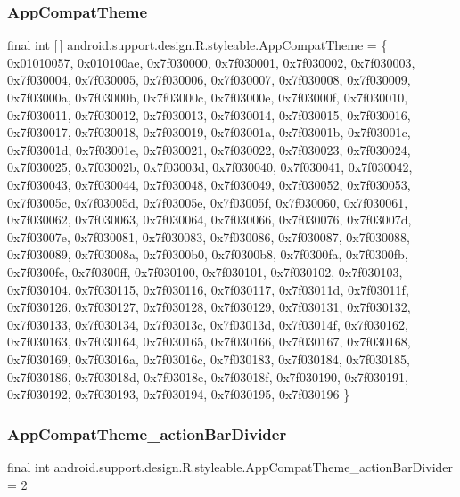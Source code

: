 \subsubsection{\texorpdfstring{App\+Compat\+Theme}{AppCompatTheme}}
{\footnotesize\ttfamily final int \mbox{[}$\,$\mbox{]} android.\+support.\+design.\+R.\+styleable.\+App\+Compat\+Theme = \{ 0x01010057, 0x010100ae, 0x7f030000, 0x7f030001, 0x7f030002, 0x7f030003, 0x7f030004, 0x7f030005, 0x7f030006, 0x7f030007, 0x7f030008, 0x7f030009, 0x7f03000a, 0x7f03000b, 0x7f03000c, 0x7f03000e, 0x7f03000f, 0x7f030010, 0x7f030011, 0x7f030012, 0x7f030013, 0x7f030014, 0x7f030015, 0x7f030016, 0x7f030017, 0x7f030018, 0x7f030019, 0x7f03001a, 0x7f03001b, 0x7f03001c, 0x7f03001d, 0x7f03001e, 0x7f030021, 0x7f030022, 0x7f030023, 0x7f030024, 0x7f030025, 0x7f03002b, 0x7f03003d, 0x7f030040, 0x7f030041, 0x7f030042, 0x7f030043, 0x7f030044, 0x7f030048, 0x7f030049, 0x7f030052, 0x7f030053, 0x7f03005c, 0x7f03005d, 0x7f03005e, 0x7f03005f, 0x7f030060, 0x7f030061, 0x7f030062, 0x7f030063, 0x7f030064, 0x7f030066, 0x7f030076, 0x7f03007d, 0x7f03007e, 0x7f030081, 0x7f030083, 0x7f030086, 0x7f030087, 0x7f030088, 0x7f030089, 0x7f03008a, 0x7f0300b0, 0x7f0300b8, 0x7f0300fa, 0x7f0300fb, 0x7f0300fe, 0x7f0300ff, 0x7f030100, 0x7f030101, 0x7f030102, 0x7f030103, 0x7f030104, 0x7f030115, 0x7f030116, 0x7f030117, 0x7f03011d, 0x7f03011f, 0x7f030126, 0x7f030127, 0x7f030128, 0x7f030129, 0x7f030131, 0x7f030132, 0x7f030133, 0x7f030134, 0x7f03013c, 0x7f03013d, 0x7f03014f, 0x7f030162, 0x7f030163, 0x7f030164, 0x7f030165, 0x7f030166, 0x7f030167, 0x7f030168, 0x7f030169, 0x7f03016a, 0x7f03016c, 0x7f030183, 0x7f030184, 0x7f030185, 0x7f030186, 0x7f03018d, 0x7f03018e, 0x7f03018f, 0x7f030190, 0x7f030191, 0x7f030192, 0x7f030193, 0x7f030194, 0x7f030195, 0x7f030196 \}\hspace{0.3cm}{\ttfamily [static]}}

\mbox{\label{classandroid_1_1support_1_1design_1_1R_1_1styleable_af6a9eaeff0ad44a2869e2b2e9b333e1e}} 
\subsubsection{\texorpdfstring{App\+Compat\+Theme\+\_\+action\+Bar\+Divider}{AppCompatTheme\_actionBarDivider}}
{\footnotesize\ttfamily final int android.\+support.\+design.\+R.\+styleable.\+App\+Compat\+Theme\+\_\+action\+Bar\+Divider = 2\hspace{0.3cm}{\ttfamily [static]}}


